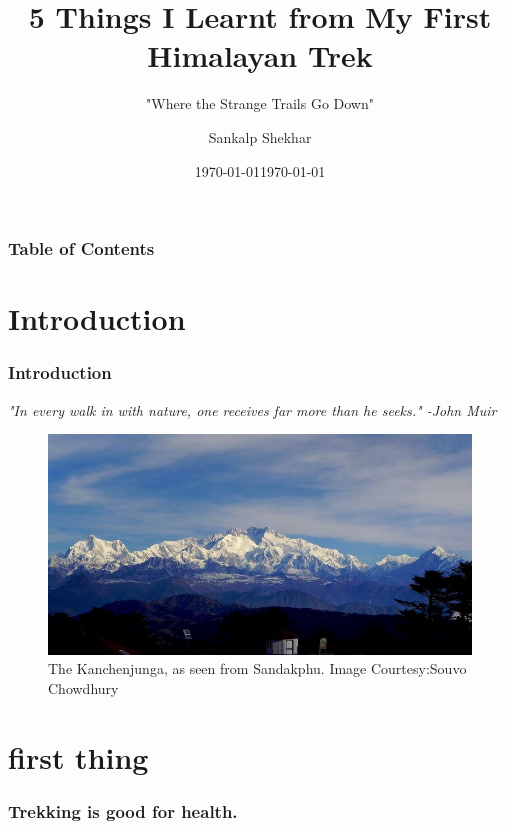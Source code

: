 \documentclass{beamer}
\title{5 Things I Learnt from My First Himalayan Trek}
\subtitle{"Where the Strange Trails Go Down"}
\author{Sankalp Shekhar}
\date{\today}
\institute{MIT, Manipal}
\date{\today}
\begin{document}
\frame{\titlepage}
\begin{frame}
\frametitle{Table of Contents}
\tableofcontents[]
\end{frame}
\section{Introduction}
\begin{frame}
\frametitle{Introduction}
 \textit{"In every walk in with nature, one receives far more than he seeks." -John Muir}
 	\begin{figure}[h] 
 		\includegraphics[width=\linewidth]{latex2.jpeg}
 		\caption{The Kanchenjunga, as seen from Sandakphu. Image Courtesy:Souvo Chowdhury}
 		\label{figref1}
 	\end{figure}
\end{frame}
\tableofcontents
\section{first thing}
\begin{frame}
\frametitle{Trekking is good for health.}
\end{frame}
\end{document}
